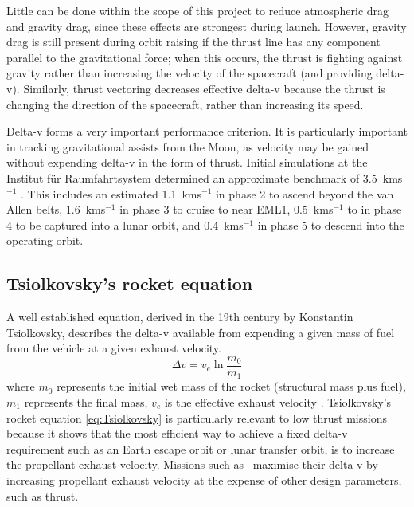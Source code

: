 \begin{figure}
\begin{center}
\label{fig:path-angles}
\end{center}
\end{figure}

Little can be done within the scope of this project to reduce atmospheric drag and gravity drag, since these effects are strongest during launch. However, gravity drag is still present during orbit raising if the thrust line has any component parallel to the gravitational force; when this occurs, the thrust is fighting against gravity rather than increasing the velocity of the spacecraft (and providing delta-v). Similarly, thrust vectoring decreases effective delta-v because the thrust is changing the direction of the spacecraft, rather than increasing its speed. 
 
Delta-v forms a very important performance criterion. It is particularly important in tracking gravitational assists from the Moon, as velocity may be gained without expending delta-v in the form of thrust. Initial simulations at the Institut f\"{u}r Raumfahrtsystem determined an approximate benchmark of 3.5~kms$^{-1}$ \parencite{Roeser2006}. This includes an estimated 1.1~kms$^{-1}$ in phase 2 to ascend beyond the van Allen belts, 1.6~kms$^{-1}$ in phase 3 to cruise to near EML1, 0.5~kms$^{-1}$ to in phase 4 to be captured into a lunar orbit, and 0.4~kms$^{-1}$ in phase 5 to descend into the operating orbit.

\subsection{Tsiolkovsky's rocket equation} \label{sec:Tsiolkovsky}

A well established equation, derived in the 19th century by Konstantin Tsiolkovsky, describes the delta-v available from expending a given mass of fuel from the vehicle at a given exhaust velocity.
\begin{equation}\label{eq:Tsiolkovsky}
\Delta v=v_{e}\ln\frac{m_{0}}{m_{1}}
\end{equation}
where $m_{0}$ represents the initial wet mass of the rocket (structural mass plus fuel), $m_{1}$ represents the final mass, $v_{e}$ is the effective exhaust velocity \parencite{Tsiolkovsky1903,Chobotov2002}. Tsiolkovsky's rocket equation \eqref{eq:Tsiolkovsky} is particularly relevant to low thrust missions because it shows that the most efficient way to achieve a fixed delta-v requirement such as an Earth escape orbit or lunar transfer orbit, is to increase the propellant exhaust velocity. Missions such as \BW\ maximise their delta-v by increasing propellant exhaust velocity at the expense of other design parameters, such as thrust.

